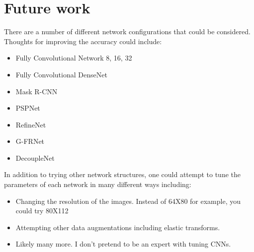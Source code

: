 \documentclass[letterpaper]{article}
\begin{document}
\section{Future work}
There are a number of different network configurations that could be considered. Thoughts for improving the accuracy could include:
\begin{itemize}
  \item Fully Convolutional Network 8, 16, 32
  \item Fully Convolutional DenseNet
  \item Mask R-CNN
  \item PSPNet
  \item RefineNet
  \item G-FRNet
  \item DecoupleNet
  
  
\end{itemize}
In addition to trying other network structures, one could attempt to tune the parameters of each network in many different ways including:
\begin{itemize}
  \item Changing the resolution of the images. Instead of 64X80 for example, you could try 80X112
  \item Attempting other data augmentations including elastic transforms. 
  \item Likely many more. I don't pretend to be an expert with tuning CNNs.
  
\end{itemize}


\end{document}
